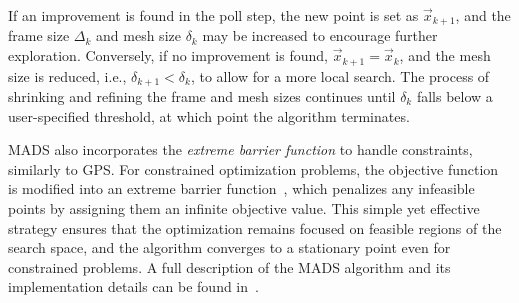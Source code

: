 If an improvement is found in the poll step, the new point is set as $ \vec{x}_{k+1} $, and the frame size $ \Delta_k $ and mesh size $ \delta_k $ may be increased to encourage further exploration. Conversely, if no improvement is found, $ \vec{x}_{k+1} = \vec{x}_k $, and the mesh size is reduced, i.e., $ \delta_{k+1} < \delta_k $, to allow for a more local search. The process of shrinking and refining the frame and mesh sizes continues until $ \delta_k $ falls below a user-specified threshold, at which point the algorithm terminates.

MADS also incorporates the \textit{extreme barrier function} to handle constraints, similarly to GPS. For constrained optimization problems, the objective function is modified into an extreme barrier function~\cite{BBO-textbook}, which penalizes any infeasible points by assigning them an infinite objective value. This simple yet effective strategy ensures that the optimization remains focused on feasible regions of the search space, and the algorithm converges to a stationary point even for constrained problems. A full description of the MADS algorithm and its implementation details can be found in~\cite{BBO-textbook}.



